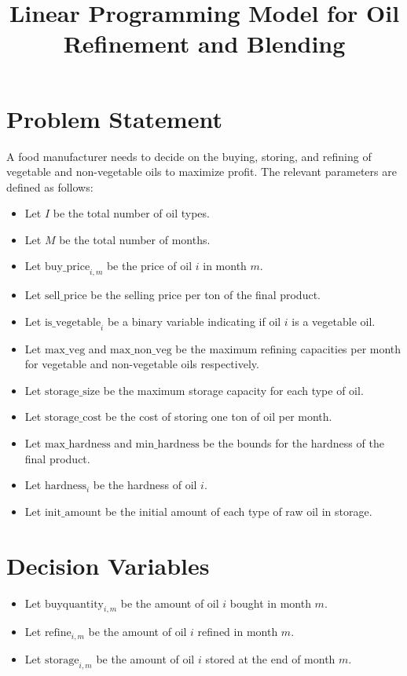 \documentclass{article}
\begin{document}
\title{Linear Programming Model for Oil Refinement and Blending}
\author{}
\date{}
\maketitle

\section*{Problem Statement}
A food manufacturer needs to decide on the buying, storing, and refining of vegetable and non-vegetable oils to maximize profit. The relevant parameters are defined as follows:

\begin{itemize}
    \item Let \( I \) be the total number of oil types.
    \item Let \( M \) be the total number of months.
    \item Let \( \text{buy\_price}_{i,m} \) be the price of oil \( i \) in month \( m \).
    \item Let \( \text{sell\_price} \) be the selling price per ton of the final product.
    \item Let \( \text{is\_vegetable}_{i} \) be a binary variable indicating if oil \( i \) is a vegetable oil.
    \item Let \( \text{max\_veg} \) and \( \text{max\_non\_veg} \) be the maximum refining capacities per month for vegetable and non-vegetable oils respectively.
    \item Let \( \text{storage\_size} \) be the maximum storage capacity for each type of oil.
    \item Let \( \text{storage\_cost} \) be the cost of storing one ton of oil per month.
    \item Let \( \text{max\_hardness} \) and \( \text{min\_hardness} \) be the bounds for the hardness of the final product.
    \item Let \( \text{hardness}_{i} \) be the hardness of oil \( i \).
    \item Let \( \text{init\_amount} \) be the initial amount of each type of raw oil in storage.
\end{itemize}

\section*{Decision Variables}
\begin{itemize}
    \item Let \( \text{buyquantity}_{i,m} \) be the amount of oil \( i \) bought in month \( m \).
    \item Let \( \text{refine}_{i,m} \) be the amount of oil \( i \) refined in month \( m \).
    \item Let \( \text{storage}_{i,m} \) be the amount of oil \( i \) stored at the end of month \( m \).
\end{itemize}
\end{document}
